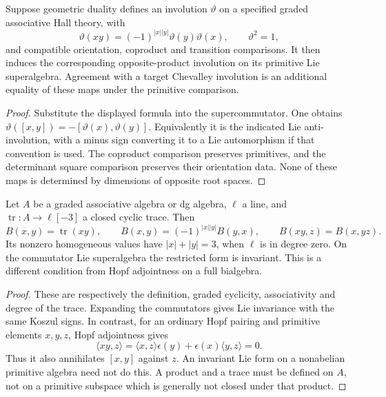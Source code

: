 \begin{proposition}
\label{prop:orientation-chevalley-antiinvolution}
Suppose geometric duality defines an involution \(\vartheta\) on a
specified graded associative Hall theory, with
\[
 \vartheta(xy)=(-1)^{|x||y|}\vartheta(y)\vartheta(x),
 \qquad \vartheta^2=1,
\]
and compatible orientation, coproduct and transition comparisons.
It then induces the corresponding opposite-product involution on
its primitive Lie superalgebra.  Agreement with a target Chevalley
involution is an additional equality of these maps under the
primitive comparison.
\end{proposition}
\begin{proof}
Substitute the displayed formula into the supercommutator.  One
obtains
\(\vartheta([x,y])=-[\vartheta(x),\vartheta(y)]\).
Equivalently it is the indicated Lie anti-involution, with a minus
sign converting it to a Lie automorphism if that convention is used.
The coproduct comparison preserves primitives, and the determinant
square comparison preserves their orientation data.  None of these
maps is determined by dimensions of opposite root spaces.
\end{proof}

\begin{proposition}
\label{prop:orientation-frobenius-pairing}
\label{prop:orientation-frobenius-trace-degree}
\label{prop:orientation-cy3-serre-signs}
Let \(A\) be a graded associative algebra or dg algebra, \(\ell\) a
line, and \(\operatorname{tr}:A\to\ell[-3]\) a closed cyclic trace.
Then
\[
 B(x,y)=\operatorname{tr}(xy),\qquad
 B(x,y)=(-1)^{|x||y|}B(y,x),\qquad
 B(xy,z)=B(x,yz).
\]
Its nonzero homogeneous values have \(|x|+|y|=3\), when \(\ell\)
is in degree zero.  On the commutator Lie superalgebra the restricted
form is invariant.  This is a different condition from Hopf
adjointness on a full bialgebra.
\end{proposition}
\begin{proof}
These are respectively the definition, graded cyclicity, associativity
and degree of the trace.  Expanding the commutators gives Lie
invariance with the same Koszul signs.  In contrast, for an ordinary
Hopf pairing and primitive elements \(x,y,z\), Hopf adjointness gives
\[
 \langle xy,z\rangle
 =\langle x,z\rangle\epsilon(y)+\epsilon(x)\langle y,z\rangle=0.
\]
Thus it also annihilates \([x,y]\) against \(z\).  An invariant Lie
form on a nonabelian primitive algebra need not do this.  A product
and a trace must be defined on \(A\), not on a primitive subspace
which is generally not closed under that product.
\end{proof}


